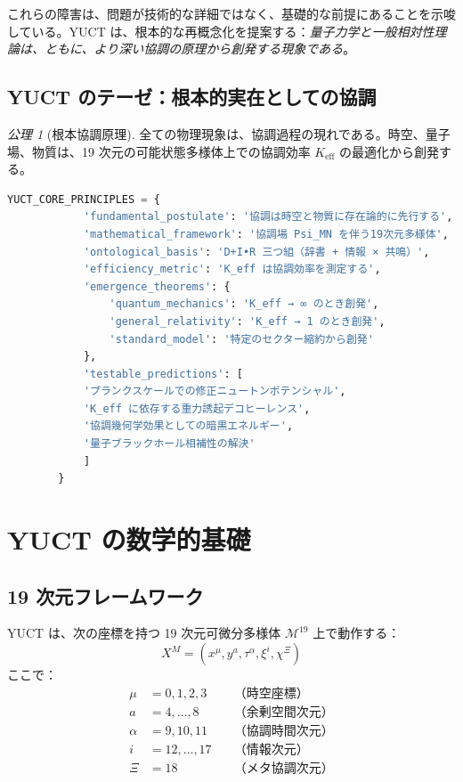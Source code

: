 \documentclass[11pt,a4paper]{article}
\theoremstyle{remark}
\newtheorem{axiom}[theorem]{公理}
\newcommand{\Keff}{K_{\mathrm{eff}}}
\begin{document}
	これらの障害は、問題が技術的な詳細ではなく、基礎的な前提にあることを示唆している。YUCT は、根本的な再概念化を提案する：\emph{量子力学と一般相対性理論は、ともに、より深い協調の原理から創発する現象である}。
	
	\subsection{YUCT のテーゼ：根本的実在としての協調}
	
	\begin{axiom}[根本協調原理]
		全ての物理現象は、協調過程の現れである。時空、量子場、物質は、19 次元の可能状態多様体上での協調効率 $\Keff$ の最適化から創発する。
	\end{axiom}
	
	\begin{lstlisting}[language=Python, caption={YUCT コア原理}, label={lst:yuct-core}]
		YUCT_CORE_PRINCIPLES = {
			'fundamental_postulate': '協調は時空と物質に存在論的に先行する',
			'mathematical_framework': '協調場 Psi_MN を伴う19次元多様体',
			'ontological_basis': 'D+I•R 三つ組（辞書 + 情報 × 共鳴）',
			'efficiency_metric': 'K_eff は協調効率を測定する',
			'emergence_theorems': {
				'quantum_mechanics': 'K_eff → ∞ のとき創発',
				'general_relativity': 'K_eff → 1 のとき創発',
				'standard_model': '特定のセクター縮約から創発'
			},
			'testable_predictions': [
			'プランクスケールでの修正ニュートンポテンシャル',
			'K_eff に依存する重力誘起デコヒーレンス',
			'協調幾何学効果としての暗黒エネルギー',
			'量子ブラックホール相補性の解決'
			]
		}
	\end{lstlisting}
	
	\section{YUCT の数学的基礎}
	\label{sec:mathematical-foundations}
	
	\subsection{19 次元フレームワーク}
	
	YUCT は、次の座標を持つ 19 次元可微分多様体 $\mathcal{M}^{19}$ 上で動作する：
	\[
	X^M = (x^\mu, y^a, \tau^\alpha, \xi^i, \chi^\Xi)
	\]
	ここで：
	\begin{align*}
		\mu &= 0,1,2,3 \quad &\text{（時空座標）} \\
		a &= 4,\dots,8 \quad &\text{（余剰空間次元）} \\
		\alpha &= 9,10,11 \quad &\text{（協調時間次元）} \\
		i &= 12,\dots,17 \quad &\text{（情報次元）} \\
		\Xi &= 18 \quad &\text{（メタ協調次元）}
	\end{align*}
	
\end{document}
